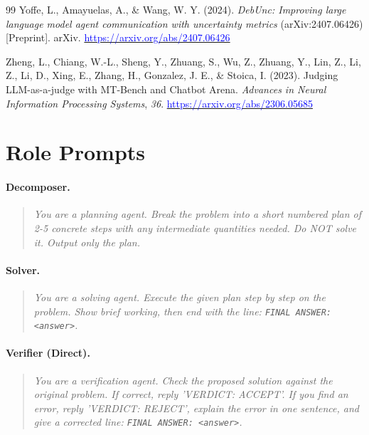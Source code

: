 \documentclass[11pt]{article}
\renewcommand{\thesection}{\Roman{section}}
\begin{document}
\begin{thebibliography}{99}
Yoffe, L., Amayuelas, A., \& Wang, W. Y. (2024). \textit{DebUnc: Improving large language
model agent communication with uncertainty metrics} (arXiv:2407.06426) [Preprint]. arXiv.
\href{https://arxiv.org/abs/2407.06426}{\textcolor{blue}{https://arxiv.org/abs/2407.06426}}

Zheng, L., Chiang, W.-L., Sheng, Y., Zhuang, S., Wu, Z., Zhuang, Y., Lin, Z., Li, Z.,
Li, D., Xing, E., Zhang, H., Gonzalez, J. E., \& Stoica, I. (2023). Judging LLM-as-a-judge
with MT-Bench and Chatbot Arena. \textit{Advances in Neural Information Processing
Systems}, \textit{36}.
\href{https://arxiv.org/abs/2306.05685}{\textcolor{blue}{https://arxiv.org/abs/2306.05685}}

\end{thebibliography}

\clearpage
\appendix
\renewcommand{\thesection}{\Alph{section}}

\section{Role Prompts}\label{sec:appendix_prompts}

\paragraph{Decomposer.}
\begin{quote}
\textit{You are a planning agent. Break the problem into a short numbered plan of 2-5 concrete steps with any intermediate quantities needed. Do NOT solve it. Output only the plan.}
\end{quote}

\paragraph{Solver.}
\begin{quote}
\textit{You are a solving agent. Execute the given plan step by step on the problem. Show brief working, then end with the line: \texttt{FINAL ANSWER: <answer>}.}
\end{quote}

\paragraph{Verifier (Direct).}
\begin{quote}
\textit{You are a verification agent. Check the proposed solution against the original problem. If correct, reply 'VERDICT: ACCEPT'. If you find an error, reply 'VERDICT: REJECT', explain the error in one sentence, and give a corrected line: \texttt{FINAL ANSWER: <answer>}.}
\end{quote}
\end{document}
